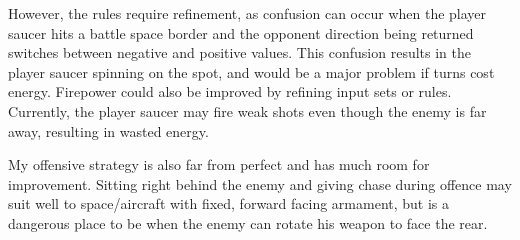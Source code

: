 However, the rules require refinement, as confusion can occur when the player saucer hits a battle space border and the opponent direction being returned switches between negative and positive values. This confusion results in the player saucer spinning on the spot, and would be a major problem if turns cost energy. Firepower could also be improved by refining input sets or rules. Currently, the player saucer may fire weak shots even though the enemy is far away, resulting in wasted energy.

My offensive strategy is also far from perfect and has much room for improvement. Sitting right behind the enemy and giving chase during offence may suit well to space/aircraft with fixed, forward facing armament, but is a dangerous place to be when the enemy can rotate his weapon to face the rear.